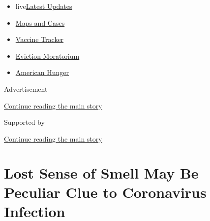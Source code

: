 \begin{itemize}
\tightlist
\item
  live\href{https://www.nytimes3xbfgragh.onion/2020/09/08/world/covid-19-coronavirus.html?name=styln-coronavirus-national\&region=TOP_BANNER\&block=storyline_menu_recirc\&action=click\&pgtype=Article\&impression_id=2a5e83f1-f1c5-11ea-b5fb-29abc66233f3\&variant=undefined}{Latest
  Updates}
\item
  \href{https://www.nytimes3xbfgragh.onion/interactive/2020/us/coronavirus-us-cases.html?name=styln-coronavirus-national\&region=TOP_BANNER\&block=storyline_menu_recirc\&action=click\&pgtype=Article\&impression_id=2a5eab00-f1c5-11ea-b5fb-29abc66233f3\&variant=undefined}{Maps
  and Cases}
\item
  \href{https://www.nytimes3xbfgragh.onion/interactive/2020/science/coronavirus-vaccine-tracker.html?name=styln-coronavirus-national\&region=TOP_BANNER\&block=storyline_menu_recirc\&action=click\&pgtype=Article\&impression_id=2a5eab01-f1c5-11ea-b5fb-29abc66233f3\&variant=undefined}{Vaccine
  Tracker}
\item
  \href{https://www.nytimes3xbfgragh.onion/2020/09/02/your-money/eviction-moratorium-covid.html?name=styln-coronavirus-national\&region=TOP_BANNER\&block=storyline_menu_recirc\&action=click\&pgtype=Article\&impression_id=2a5eab02-f1c5-11ea-b5fb-29abc66233f3\&variant=undefined}{Eviction
  Moratorium}
\item
  \href{https://www.nytimes3xbfgragh.onion/interactive/2020/09/02/magazine/food-insecurity-hunger-us.html?name=styln-coronavirus-national\&region=TOP_BANNER\&block=storyline_menu_recirc\&action=click\&pgtype=Article\&impression_id=2a5eab03-f1c5-11ea-b5fb-29abc66233f3\&variant=undefined}{American
  Hunger}
\end{itemize}

Advertisement

\protect\hyperlink{after-top}{Continue reading the main story}

Supported by

\protect\hyperlink{after-sponsor}{Continue reading the main story}

\hypertarget{lost-sense-of-smell-may-be-peculiar-clue-to-coronavirus-infection}{%
\section{Lost Sense of Smell May Be Peculiar Clue to Coronavirus
Infection}\label{lost-sense-of-smell-may-be-peculiar-clue-to-coronavirus-infection}}

